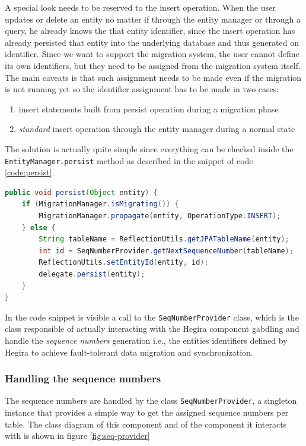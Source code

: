 \noindent A special look needs to be reserved to the insert operation. When the user updates or delete an entity no matter if through the entity manager or through a query, he already knows the that entity identifier, since the insert operation has already persisted that entity into the underlying database and thus generated on identifier.
Since we want to support the migration system, the user cannot define its own identifiers, but they need to be assigned from the migration system itself.
The main caveats is that such assignment needs to be made even if the migration is not running yet so the identifier assignment has to be made in two cases:
\begin{enumerate}
\item insert statements built from persist operation during a migration phase
\item \textit{standard} insert operation through the entity manager during a normal state
\end{enumerate}

\noindent The solution is actually quite simple since everything can be checked inside the \texttt{EntityManager.persist} method as described in the snippet of code \ref{code:persist}.

\begin{lstlisting}[language=Java, caption=Persist operation, label=code:persist]
public void persist(Object entity) {
    if (MigrationManager.isMigrating()) {
        MigrationManager.propagate(entity, OperationType.INSERT);
    } else {
        String tableName = ReflectionUtils.getJPATableName(entity);
        int id = SeqNumberProvider.getNextSequenceNumber(tableName);
        ReflectionUtils.setEntityId(entity, id);
        delegate.persist(entity);
    }
}
\end{lstlisting}

\noindent In the code snippet is visible a call to the  \texttt{SeqNumberProvider} class, which is the class responsible of actually interacting with the Hegira component gabdling and handle the \textit{sequence numbers} generation i.e., the entities identifiers defined by Hegira to achieve fault-tolerant data migration and synchronization. 

\subsubsection{Handling the sequence numbers}
The sequence numbers are handled by the class \texttt{SeqNumberProvider}, a singleton instance that provides a simple way to get the assigned sequence numbers per table.
\noindent The class diagram of this component and of the component it interacts with is shown in figure \ref{fig:seq-provider}


